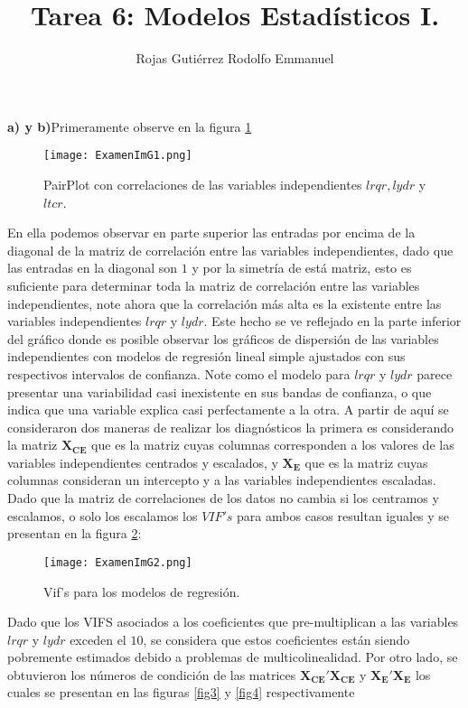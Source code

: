 \documentclass[10.5pt,notitlepage]{article}
\title{Tarea 6: Modelos Estadísticos I.}
\author{Rojas Gutiérrez Rodolfo Emmanuel}
\theoremstyle{plain}
\begin{document}
\maketitle

\setcounter{exo}{0}
\begin{exo}
\end{exo}

\textbf{a) y b)}Primeramente observe en la figura \ref{fig1}
\begin{figure}[htb]
 \centering
 \texttt{[image: ExamenImG1.png]}
 \caption{PairPlot con correlaciones de las variables independientes \(lrqr,lydr\) y \(ltcr\).}
\label{fig1}
\end{figure}
En ella podemos observar en parte superior las entradas por encima de la diagonal de la matriz de correlación entre las variables independientes, dado que las entradas en la diagonal son \(1\) y por la simetría de está matriz, esto es suficiente para determinar toda la matriz de correlación entre las variables independientes, note ahora que la correlación más alta es la existente entre las variables independientes \(lrqr\) y \(lydr\). Este hecho se ve reflejado en la parte inferior del gráfico donde es posible observar los gráficos de dispersión de las variables independientes con modelos de regresión lineal simple ajustados con sus respectivos intervalos de confianza. Note como el modelo para \(lrqr\) y \(lydr\) parece presentar una variabilidad casi inexistente en sus bandas de confianza, o que indica que una variable explica casi perfectamente a la otra. A partir de aquí se consideraron dos maneras de realizar los diagnósticos la primera es considerando la matriz \(\mathbf{X_{CE}}\) que es la matriz cuyas columnas corresponden a los valores de las variables independientes centrados y escalados, y \(\mathbf{X_{E}}\) que es la matriz cuyas columnas consideran un intercepto y a las variables independientes escaladas. Dado que la matriz de correlaciones de los datos no cambia si los centramos y escalamos, o solo los escalamos los \(VIF's\) para ambos casos resultan iguales y se presentan en la figura \ref{fig2}: 
\begin{figure}[htb]
 \centering
 \texttt{[image: ExamenImG2.png]}
 \caption{Vif's para los modelos de regresión.}
\label{fig2}
\end{figure}
Dado que los VIFS asociados a los coeficientes que pre-multiplican a las variables \(lrqr\) y \(lydr\) exceden el \(10\), se considera que estos coeficientes están siendo pobremente estimados debido a problemas de multicolinealidad. Por otro lado, se obtuvieron los números de condición de las matrices \(\mathbf{X_{CE}}' \mathbf{X_{CE}}\) y \(\mathbf{X_{E}}'\mathbf{X_{E}}\) los cuales se presentan en las figuras \eqref{fig3} y \ref{fig4} respectivamente 
\end{document}
